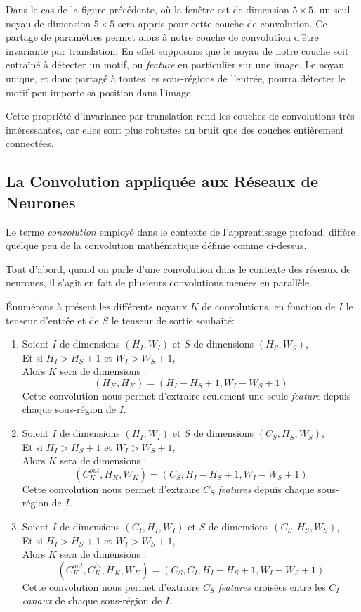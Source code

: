 \documentclass[a4paper, 11pt]{report}
\begin{document}
Dans le cas de la figure précédente, où la fenêtre est de dimension $5 \times 5$, un seul noyau de dimension $5 \times 5$ sera appris pour cette couche de convolution.
Ce partage de paramètres permet alors à notre couche de convolution d'être invariante par translation.
En effet supposons que le noyau de notre couche soit entraîné à détecter un motif, ou \emph{feature} en particulier sur une image. Le noyau unique, et donc partagé à toutes les sous-régions de l'entrée, pourra détecter le motif peu importe sa position dans l'image.
			
Cette propriété d'invariance par translation rend les couches de convolutions très intéressantes, car elles sont plus robustes au bruit que des couches entièrement connectées.
				
\subsection{La Convolution appliquée aux Réseaux de Neurones}
Le terme \emph{convolution} employé dans le contexte de l'apprentissage profond, diffère quelque peu de la convolution mathématique définie comme ci-dessus.

Tout d'abord, quand on parle d'une convolution dans le contexte des réseaux de neurones, il s'agit en fait de plusieurs convolutions menées en parallèle.

Énumérons à présent les différents noyaux $K$ de convolutions, en fonction de $I$ le tenseur d'entrée et de $S$ le tenseur de sortie souhaité:
\begin{enumerate}
	\item Soient $I$ de dimensions $(H_I,W_I)$ et $S$ de dimensions $(H_S, W_S)$,\\
	Et si $H_I > H_S + 1$ et $W_I > W_S + 1$,\\
	Alors $K$ sera de dimensions :
	$$(H_K, H_K) = (H_I - H_S + 1, W_I - W_S + 1)$$
	Cette convolution nous permet d'extraire seulement une seule \emph{feature} depuis chaque sous-région de $I$.\\
	\item Soient $I$ de dimensions $(H_I,W_I)$ et $S$ de dimensions $(C_S, H_S, W_S)$,\\
	Et si $H_I > H_S + 1$ et $W_I > W_S + 1$,\\
	Alors $K$ sera de dimensions :
	$$(C_K^{out}, H_K, W_K) = (C_S, H_I - H_S + 1, W_I - W_S + 1)$$
	Cette convolution nous permet d'extraire $C_S$ \emph{features} depuis chaque sous-région de $I$.\\
	\item Soient $I$ de dimensions $(C_I, H_I,W_I)$ et $S$ de dimensions $(C_S, H_S, W_S)$,\\
	Et si $H_I > H_S + 1$ et $W_I > W_S + 1$,\\
	Alors $K$ sera de dimensions :
	$$(C_K^{out}, C_K^{in}, H_K, W_K) = (C_S, C_I, H_I - H_S + 1, W_I - W_S + 1)$$
	Cette convolution nous permet d'extraire $C_S$ \emph{features} croisées entre les $C_I$ \emph{canaux} de chaque sous-région de $I$.\\	
\end{enumerate}
\end{document}
